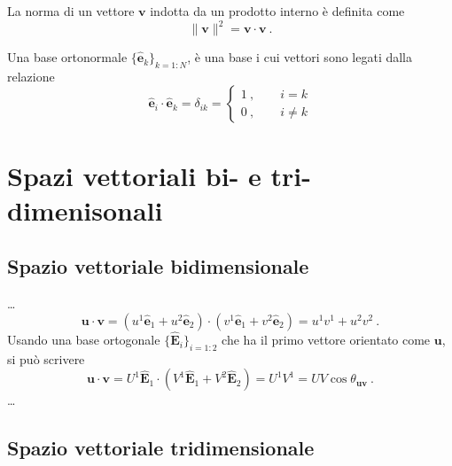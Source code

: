 \begin{definition} La norma di un vettore $\mathbf{v}$ indotta da un prodotto interno è definita come
    \begin{equation}
        \| \mathbf{v} \|^2 = \mathbf{v} \cdot \mathbf{v} \ .
    \end{equation}
\end{definition}

\begin{definition} Una base ortonormale $\{ \mathbf{\hat{e}}_k \}_{k=1:N}$, è una base i cui vettori sono legati dalla relazione
    \begin{equation}
        \mathbf{\hat{e}}_i \cdot \mathbf{\hat{e}}_k = \delta_{ik} =
        \begin{cases} 1 \ , \qquad i = k \\ 0 \ , \qquad i \ne k \end{cases}
    \end{equation}
\end{definition}

\section{Spazi vettoriali bi- e tri-dimenisonali}
\subsection{Spazio vettoriale bidimensionale}
{\color{red} \dots}
\begin{equation}
    \mathbf{u} \cdot \mathbf{v} =
    ( u^1 \mathbf{\hat{e}}_1 + u^2 \mathbf{\hat{e}}_2) \cdot ( v^1 \mathbf{\hat{e}}_1 + v^2 \mathbf{\hat{e}}_2) = u^1 v^1 + u^2 v^2 \ . 
\end{equation}
Usando una base ortogonale $\{ \mathbf{\hat{E}}_i \}_{i=1:2}$ che ha il primo vettore orientato come $\mathbf{u}$, si può scrivere
\begin{equation}
    \mathbf{u} \cdot \mathbf{v} =
      U^1 \mathbf{\hat{E}}_1 \cdot ( V^1 \mathbf{\hat{E}}_1 + V^2 \mathbf{\hat{E}}_2) = U^1 V^1 = U V \cos \theta_{\mathbf{u} \mathbf{v}} \ . 
\end{equation}
{\color{red} \dots}

\subsection{Spazio vettoriale tridimensionale}

